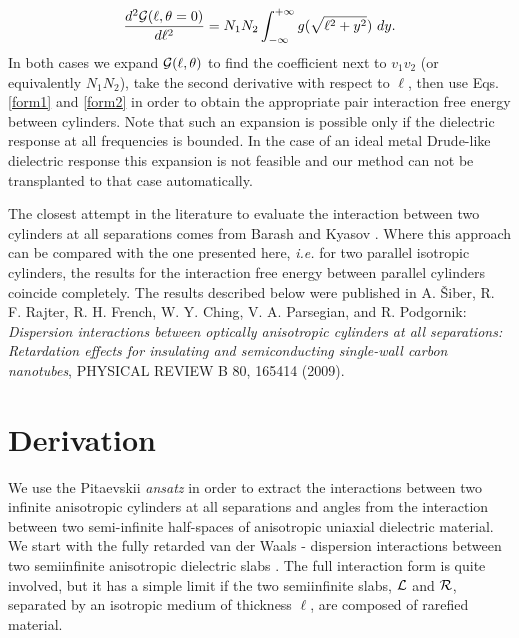 \documentclass[onecolumn,letterpaper,amsmath,amssymb,floatfix,aps,superscriptaddress]{revtex4}
\begin{document}
\begin{equation}
\frac{d^{2}{\cal G}(\ell,\theta=0)}{d\ell^{2}}=N_1 N_2\int_{-\infty}^{+\infty}g(\sqrt{\ell^{2}+y^{2}})~dy.
\label{form2}
\end{equation}
In both cases we expand ${\cal G}(\ell,\theta)$ to find the coefficient next to $v_1 v_2$ (or equivalently $N_1 N_2$), take the second derivative with respect to $\ell$, then use Eqs. \ref{form1} and \ref{form2} in order to obtain the appropriate pair interaction free energy between cylinders. Note that such an expansion is possible only if the dielectric response at all frequencies is bounded. In the case of an ideal metal Drude-like dielectric response this expansion is not feasible and our method can not be transplanted to that case automatically.

The closest attempt in the literature to evaluate the interaction between two cylinders at all separations comes from Barash and Kyasov \cite{Barash89}.  Where this approach can be compared with the one presented here, {\sl i.e.} for two parallel isotropic cylinders, the results for the interaction free energy between parallel cylinders coincide completely. The results described below were published in A. \v Siber, R. F. Rajter, R. H. French, W. Y. Ching, V. A. Parsegian, and R. Podgornik: {\sl Dispersion interactions between optically anisotropic cylinders at all separations: Retardation effects for insulating and semiconducting single-wall carbon nanotubes}, PHYSICAL REVIEW B 80, 165414 (2009).

\section{Derivation}

We use the Pitaevskii {\sl ansatz} in order to extract the interactions between two infinite anisotropic cylinders at all separations and angles from the interaction between 
two semi-infinite half-spaces of anisotropic uniaxial dielectric material. We start with the fully retarded van der Waals - dispersion interactions between two semiinfinite anisotropic 
dielectric slabs \cite{Barash}. The full interaction form is quite involved, but it has a simple limit if the two semiinfinite slabs, ${\cal L}$ and ${\cal R}$, separated by an isotropic medium of thickness $\ell$, are composed of rarefied material. 
\end{document}
